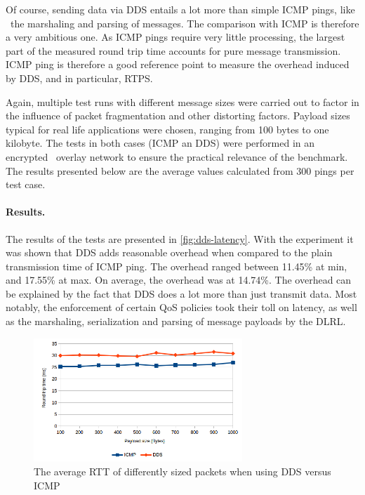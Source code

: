 Of course, sending data via DDS entails a lot more than simple ICMP pings, like \eg\ the marshaling and parsing of messages. The comparison with ICMP is therefore a very ambitious one. As ICMP pings require very little processing, the largest part of the measured round trip time accounts for pure message transmission. ICMP ping is therefore a good reference point to measure the overhead induced by DDS, and in particular, RTPS. 

Again, multiple test runs with different message sizes were carried out to factor in the influence of packet fragmentation and other distorting factors. Payload sizes typical for real life applications were chosen, ranging from 100 bytes to one kilobyte. The tests in both cases (ICMP an DDS) were performed in an encrypted \wnet\ overlay network to ensure the practical relevance of the benchmark. The results presented below are the average values calculated from 300 pings per test case.


\paragraph{Results.} 
The results of the tests are presented in \autoref{fig:dds-latency}. With the experiment it was shown that DDS adds reasonable overhead when compared to the plain transmission time of ICMP ping. The overhead ranged between 11.45\% at min, and 17.55\% at max. On average, the overhead was at 14.74\%. The overhead can be explained by the fact that DDS does a lot more than just transmit data. Most notably, the enforcement of certain QoS policies took their toll on latency, as well as the marshaling, serialization and parsing of message payloads by the DLRL.


\begin{figure}[htpb]
  \centering
  \includegraphics[width=0.7\textwidth]{figures/dds-latency}
  \caption[DDS latency benchmark results]{The average RTT of differently sized packets when using DDS versus ICMP}\label{fig:dds-latency}
\end{figure}

